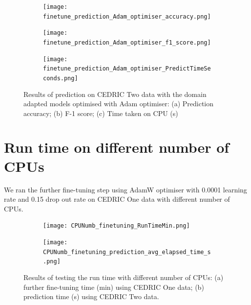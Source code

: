 \documentclass[a4paper,12pt]{article}
\newcommand{\figwidthhh}{0.45\textwidth}
\newcommand{\inghamOne}{CEDRIC One\xspace}   %
\newcommand{\inghamTwo}{CEDRIC Two\xspace}  %
\begin{document}
\begin{figure}[h!]
	\begin{center}
		\begin{subfigure}[b]{\figwidthhh}
			\caption{} 
			\texttt{[image: finetune\_prediction\_Adam\_optimiser\_accuracy.png]}
		\end{subfigure}
        \hfill
		\begin{subfigure}[b]{\figwidthhh}
			\caption{}
			\texttt{[image: finetune\_prediction\_Adam\_optimiser\_f1\_score.png]}
		\end{subfigure}
        \hfill
		\begin{subfigure}[b]{\figwidthhh}
			\caption{}
			\texttt{[image: finetune\_prediction\_Adam\_optimiser\_PredictTimeSeconds.png]}
		\end{subfigure}
	\end{center}
	\caption{Results of prediction on \inghamTwo data with the domain adapted models optimised with Adam optimiser: (a) Prediction accuracy; (b) F-1 score; (c) Time taken on CPU (s)
	} 
\end{figure}


\newpage
\section{Run time on different number of CPUs}

We ran the further fine-tuning step using AdamW optimiser with 0.0001 learning rate and 0.15 drop out rate on \inghamOne data with different number of CPUs.

\begin{figure}[h!]
	\begin{center}
		\begin{subfigure}[b]{\figwidthhh}
			\caption{} 
			\texttt{[image: CPUNumb\_finetuning\_RunTimeMin.png]}
		\end{subfigure}
		\hfill
		\begin{subfigure}[b]{\figwidthhh}
			\caption{}
			\texttt{[image: CPUNumb\_finetuning\_prediction\_avg\_elapsed\_time\_s.png]}
		\end{subfigure}
	\end{center}                                                                
	\caption{Results of testing the run time with different number of CPUs: (a) further fine-tuning time (min) using \inghamOne data; (b) prediction time (s) using \inghamTwo data.
	}
\end{figure}
\end{document}
